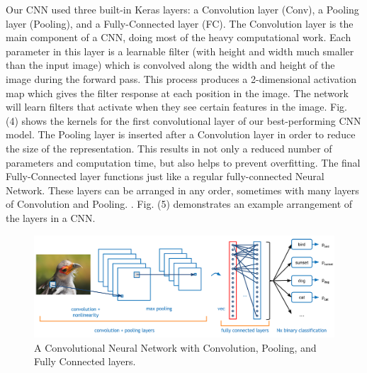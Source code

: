 \documentclass{article}
\begin{document}
Our CNN used three built-in Keras layers: a Convolution layer (Conv),
a Pooling layer (Pooling), and a Fully-Connected layer (FC). The
Convolution layer is the main component of a CNN, doing most of the
heavy computational work. Each parameter in this layer is a learnable
filter (with height and width much smaller than the input image) which
is convolved along the width and height of the image during the
forward pass. This process produces a 2-dimensional activation map
which gives the filter response at each position in the image. The
network will learn filters that activate when they see certain
features in the image. Fig. (4) shows the kernels for the first
convolutional layer of our best-performing CNN model. The Pooling
layer is inserted after a Convolution layer in order to reduce the
size of the representation. This results in not only a reduced number
of parameters and computation time, but also helps to prevent
overfitting. The final Fully-Connected layer functions just like a
regular fully-connected Neural Network. These layers can be arranged
in any order, sometimes with many layers of Convolution and
Pooling. \cite{cs231n}. Fig. (5) demonstrates an example arrangement
of the layers in a CNN. 




\begin{figure}[ht]
\vskip 0.2in
\begin{center}
\centerline{\includegraphics[scale = .8]{cnn}}
\caption{A Convolutional Neural Network with Convolution, Pooling, and Fully Connected layers.}
\label{cnn1}
\end{center}
\vskip -0.2in
\end{figure}
\end{document}
